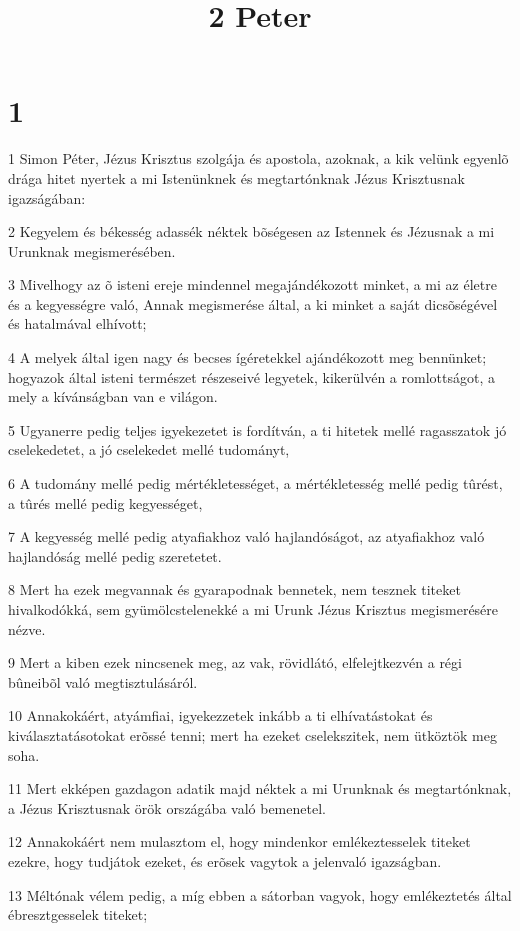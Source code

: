 

\title{2 Peter}


\chapter{1}

\par 1 Simon Péter, Jézus Krisztus szolgája és apostola, azoknak, a  kik velünk egyenlõ drága hitet nyertek a mi Istenünknek és megtartónknak Jézus Krisztusnak igazságában:
\par 2 Kegyelem és békesség adassék néktek bõségesen az Istennek és Jézusnak a mi Urunknak megismerésében.
\par 3 Mivelhogy az õ isteni ereje mindennel megajándékozott minket, a mi az életre és a kegyességre való, Annak megismerése által, a ki minket a saját dicsõségével és hatalmával elhívott;
\par 4 A melyek által igen nagy és becses ígéretekkel ajándékozott meg bennünket; hogyazok által isteni természet részeseivé legyetek, kikerülvén a  romlottságot, a mely a kívánságban van e világon.
\par 5 Ugyanerre pedig teljes igyekezetet is fordítván, a ti hitetek mellé ragasszatok jó cselekedetet, a jó cselekedet mellé tudományt,
\par 6 A tudomány mellé pedig mértékletességet, a mértékletesség mellé pedig tûrést, a tûrés mellé pedig kegyességet,
\par 7 A kegyesség mellé pedig atyafiakhoz való hajlandóságot, az atyafiakhoz való hajlandóság mellé pedig szeretetet.
\par 8 Mert ha ezek megvannak és gyarapodnak bennetek, nem tesznek titeket hivalkodókká, sem gyümölcstelenekké a mi Urunk Jézus Krisztus megismerésére nézve.
\par 9 Mert a kiben ezek nincsenek meg, az vak, rövidlátó, elfelejtkezvén a régi bûneibõl való  megtisztulásáról.
\par 10 Annakokáért, atyámfiai, igyekezzetek inkább a ti elhívatástokat és kiválasztatásotokat erõssé tenni; mert ha ezeket cselekszitek, nem ütköztök meg soha.
\par 11 Mert ekképen gazdagon adatik majd néktek a mi Urunknak és megtartónknak, a Jézus Krisztusnak örök országába való bemenetel.
\par 12 Annakokáért nem mulasztom el, hogy mindenkor emlékeztesselek titeket ezekre, hogy tudjátok ezeket, és erõsek vagytok a jelenvaló igazságban.
\par 13 Méltónak vélem pedig, a míg ebben a sátorban vagyok, hogy emlékeztetés által ébresztgesselek titeket;
